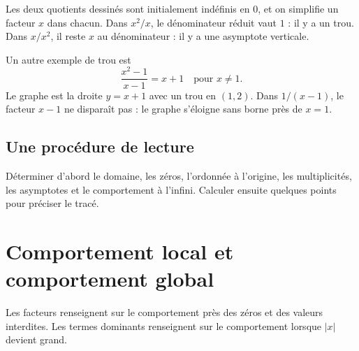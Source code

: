 \begin{center}
\qquad
{}
\end{center}

\begin{connectionbox}
Les deux quotients dessinés sont initialement indéfinis en $0$, et on simplifie un facteur $x$ dans chacun. Dans $x^2/x$, le dénominateur réduit vaut $1$ : il y a un trou. Dans $x/x^2$, il reste $x$ au dénominateur : il y a une asymptote verticale.

Un autre exemple de trou est
\[
\frac{x^2-1}{x-1}=x+1\quad\text{pour }x\ne1.
\]
Le graphe est la droite $y=x+1$ avec un trou en $(1,2)$. Dans $1/(x-1)$, le facteur $x-1$ ne disparaît pas : le graphe s'éloigne sans borne près de $x=1$.
\end{connectionbox}

\subsection{Une procédure de lecture}
Déterminer d'abord le domaine, les zéros, l'ordonnée à l'origine, les multiplicités, les asymptotes et le comportement à l'infini. Calculer ensuite quelques points pour préciser le tracé.


\section{Comportement local et comportement global}
\label{manual:section:05.03}

Les facteurs renseignent sur le comportement près des zéros et des valeurs interdites. Les termes dominants renseignent sur le comportement lorsque $|x|$ devient grand.

